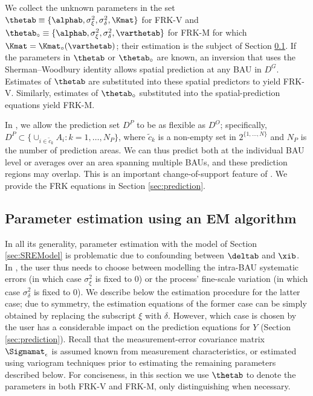 We collect the unknown parameters in the set $\thetab \equiv \{\alphab, \sigma^2_\xi, \sigma^2_\delta, \Kmat\}$ for FRK-V and $\thetab_\circ \equiv \{\alphab, \sigma^2_\xi, \sigma^2_\delta, \varthetab\}$ for FRK-M for which $\Kmat = \Kmat_\circ(\varthetab)$; their estimation is the subject of Section \ref{sec:estimation}. If the parameters in $\thetab$ or $\thetab_\circ$ are known, an inversion that uses the Sherman--Woodbury identity \citep{Henderson_1981} allows spatial prediction at any BAU in $D^G$. Estimates of $\thetab$ are substituted into these spatial predictors to yield FRK-V. Similarly, estimates of $\thetab_\circ$ substituted into the spatial-prediction equations yield FRK-M.

In , we allow the prediction set $D^P$ to be as flexible as $D^O$; specifically, $D^P \subset \{ \cup_{i \in \tilde{c}_k} A_i : k = 1,\dots,N_P \}$, where $\tilde{c}_k$ is a non-empty set in $2^{\{1,\dots,N\}}$ and $N_P$ is the number of prediction areas. We can thus predict both at the individual BAU level or averages over an area spanning multiple BAUs, and these prediction regions may overlap. This is an important change-of-support feature of . We provide the FRK equations in Section \ref{sec:prediction}.

\subsection{Parameter estimation using an EM algorithm} \label{sec:estimation}

In all its generality, parameter estimation with the model of Section \ref{sec:SREModel} is problematic due to confounding between $\deltab$ and $\xib$. In , the user thus needs to choose between modelling the intra-BAU systematic errors (in which case $\sigma^2_\xi$ is fixed to 0) or the process' fine-scale variation (in which case $\sigma^2_\delta$ is fixed to 0). 
We describe below the estimation procedure for the latter case; due to symmetry, the estimation equations of the former case can be simply obtained by replacing the subscript $\xi$ with $\delta$. However, which case is chosen by the user has a considerable impact on the prediction equations for $Y$ (Section \ref{sec:prediction}). Recall that the measurement-error covariance matrix $\Sigmamat_\epsilon$ is assumed known from measurement characteristics, or estimated using variogram techniques prior to estimating the remaining parameters described below. For conciseness, in this section we use $\thetab$ to denote the parameters in both FRK-V and FRK-M, only distinguishing when necessary.

